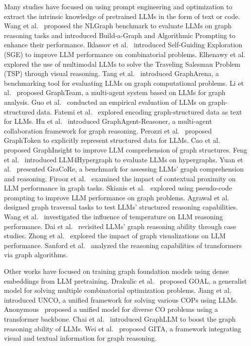 Many studies have focused on using prompt engineering and optimization to extract the intrinsic knowledge of pretrained LLMs in the form of text or code. Wang et al.~\cite{wang2024can} proposed the NLGraph benchmark to evaluate LLMs on graph reasoning tasks and introduced Build-a-Graph and Algorithmic Prompting to enhance their performance. Iklassov et al.~\cite{iklassov2024self} introduced Self-Guiding Exploration (SGE) to improve LLM performance on combinatorial problems. Elhenawy et al.~\cite{elhenawy2024eyeballing, elhenawy2024visual} explored the use of multimodal LLMs to solve the Traveling Salesman Problem (TSP) through visual reasoning. Tang et al.~\cite{tang2024grapharena} introduced GraphArena, a benchmarking tool for evaluating LLMs on graph computational problems. Li et al.~\cite{li2024graphteam} proposed GraphTeam, a multi-agent system based on LLMs for graph analysis. Guo et al.~\cite{guo2023gpt4graph} conducted an empirical evaluation of LLMs on graph-structured data. Fatemi et al.~\cite{fatemi2023talk} explored encoding graph-structured data as text for LLMs. Hu et al.~\cite{hu2024scalable} introduced GraphAgent-Reasoner, a multi-agent collaboration framework for graph reasoning. Perozzi et al.~\cite{perozzi2024let} proposed GraphToken to explicitly represent structured data for LLMs. Cao et al.~\cite{cao2024graphinsight} proposed GraphInsight to improve LLM comprehension of graph structures. Feng et al.~\cite{feng2024beyond} introduced LLM4Hypergraph to evaluate LLMs on hypergraphs. Yuan et al.~\cite{yuan2024gracore} presented GraCoRe, a benchmark for assessing LLMs' graph comprehension and reasoning. Firooz et al.~\cite{firooz2024lost} examined the impact of contextual proximity on LLM performance in graph tasks. Skianis et al.~\cite{skianis2024graph} explored using pseudo-code prompting to improve LLM performance on graph problems. Agrawal et al.~\cite{agrawal2024exploring} designed graph traversal tasks to test LLMs' structured reasoning capabilities. Wang et al.~\cite{wang2024reasoning} investigated the influence of temperature on LLM reasoning performance. Dai et al.~\cite{dai2024revisiting} revisited LLMs' graph reasoning ability through case studies. Zhong et al.~\cite{zhong2024exploring} explored the impact of graph visualizations on LLM performance. Sanford et al.~\cite{sanford2024understanding} analyzed the reasoning capabilities of transformers via graph algorithms.

Other works have focused on training graph foundation models using dense embeddings from LLM pretraining. Drakulic et al.~\cite{drakulic2024goal} proposed GOAL, a generalist model for solving multiple combinatorial optimization problems. Jiang et al.~\cite{jiang2024unco} introduced UNCO, a unified framework for solving various COPs using LLMs. Anonymous~\cite{anonymous2024solving} proposed a unified model for diverse CO problems using a transformer backbone. Chai et al.~\cite{chai2023graphllm} introduced GraphLLM to boost the graph reasoning ability of LLMs. Wei et al.~\cite{wei2024rendering} proposed GITA, a framework integrating visual and textual information for graph reasoning.


